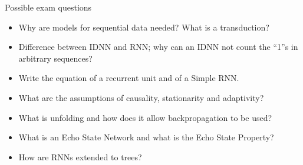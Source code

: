 \begin{boxquestion}{Possible exam questions}

\begin{itemize}
\tightlist
\item
  Why are models for sequential data needed? What is a transduction?
\item
  Difference between IDNN and RNN; why can an IDNN not count the
  ``1''s in arbitrary sequences?
\item
  Write the equation of a recurrent unit and of a Simple RNN.
\item
  What are the assumptions of causality, stationarity and adaptivity?
\item
  What is unfolding and how does it allow backpropagation to be used?
\item
  What is an Echo State Network and what is the Echo State Property?
\item
  How are RNNs extended to trees?
\end{itemize}

\end{boxquestion}
